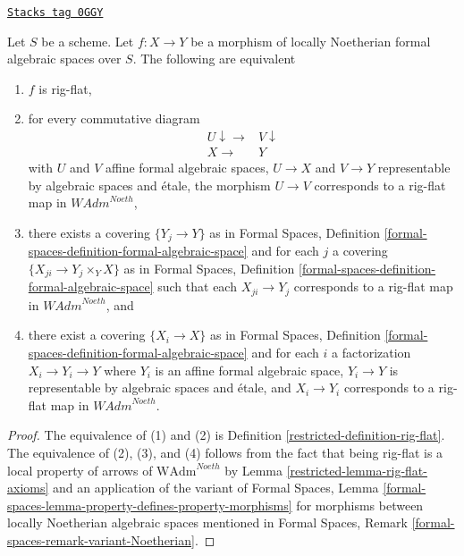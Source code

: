 \begin{lemma}
\label{restricted-lemma-rig-flat-morphisms}
\href{https://stacks.math.columbia.edu/tag/0GGY}{\texttt{Stacks tag 0GGY}}

Let $S$ be a scheme. Let $f : X \to Y$ be a morphism of
locally Noetherian formal algebraic spaces over $S$.
The following are equivalent
\begin{enumerate}
\item $f$ is rig-flat,
\item for every commutative diagram
$$
\begin{array}{cc}U \downarrow\longrightarrow & V \downarrow \\ X \longrightarrow & Y\end{array}
$$
with $U$ and $V$ affine formal algebraic spaces, $U \to X$ and $V \to Y$
representable by algebraic spaces and \'etale, the morphism $U \to V$
corresponds to a rig-flat map in $\textit{WAdm}^{Noeth}$,
\item there exists a covering $\{Y_j \to Y\}$ as in
Formal Spaces,
Definition \ref{formal-spaces-definition-formal-algebraic-space}
and for each $j$
a covering $\{X_{ji} \to Y_j \times_Y X\}$ as in
Formal Spaces,
Definition \ref{formal-spaces-definition-formal-algebraic-space}
such that each $X_{ji} \to Y_j$  corresponds
to a rig-flat map in $\textit{WAdm}^{Noeth}$, and
\item there exist a covering $\{X_i \to X\}$ as in
Formal Spaces,
Definition \ref{formal-spaces-definition-formal-algebraic-space}
and for each $i$ a factorization $X_i \to Y_i \to Y$ where $Y_i$
is an affine formal algebraic space, $Y_i \to Y$ is representable
by algebraic spaces and \'etale, and $X_i \to Y_i$ corresponds
to a rig-flat map in $\textit{WAdm}^{Noeth}$.
\end{enumerate}
\end{lemma}

\begin{proof}

The equivalence of (1) and (2) is Definition \ref{restricted-definition-rig-flat}.
The equivalence of (2), (3), and (4) follows from the fact that
being rig-flat is a local property of arrows of
$\text{WAdm}^{Noeth}$ by Lemma \ref{restricted-lemma-rig-flat-axioms}
and an application of the variant of
Formal Spaces, Lemma
\ref{formal-spaces-lemma-property-defines-property-morphisms}
for morphisms between locally Noetherian algebraic spaces
mentioned in
Formal Spaces, Remark
\ref{formal-spaces-remark-variant-Noetherian}.
\end{proof}

